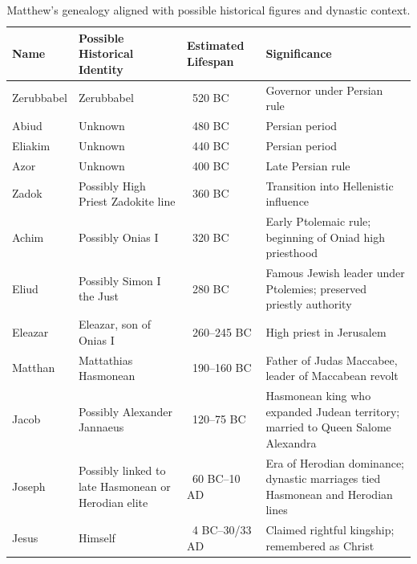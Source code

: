 \begin{table}[h]
    \centering
    \begin{tabular}{|l|p{3cm}|p{2.5cm}|p{4.5cm}|}
        \hline
        \textbf{Name} & \textbf{Possible Historical Identity} & \textbf{Estimated Lifespan} & \textbf{Significance} \\ \hline
        Zerubbabel & Zerubbabel & ~520 BC & Governor under Persian rule \\ \hline
        Abiud & Unknown & ~480 BC & Persian period \\ \hline
        Eliakim & Unknown & ~440 BC & Persian period \\ \hline
        Azor & Unknown & ~400 BC & Late Persian rule \\ \hline
        Zadok & Possibly High Priest Zadokite line & ~360 BC & Transition into Hellenistic influence \\ \hline
        Achim & Possibly Onias I & ~320 BC & Early Ptolemaic rule; beginning of Oniad high priesthood \\ \hline
        Eliud & Possibly Simon I the Just & ~280 BC & Famous Jewish leader under Ptolemies; preserved priestly authority \\ \hline
        Eleazar & Eleazar, son of Onias I & ~260--245 BC & High priest in Jerusalem \\ \hline
        Matthan & Mattathias Hasmonean & ~190--160 BC & Father of Judas Maccabee, leader of Maccabean revolt \\ \hline
        Jacob & Possibly Alexander Jannaeus & ~120--75 BC & Hasmonean king who expanded Judean territory; married to Queen Salome Alexandra \\ \hline
        Joseph & Possibly linked to late Hasmonean or Herodian elite & ~60 BC--10 AD & Era of Herodian dominance; dynastic marriages tied Hasmonean and Herodian lines \\ \hline
        Jesus & Himself & ~4 BC--30/33 AD & Claimed rightful kingship; remembered as Christ \\ \hline
    \end{tabular}
    \caption{Matthew’s genealogy aligned with possible historical figures and dynastic context.}\label{tab:table}
\end{table}

